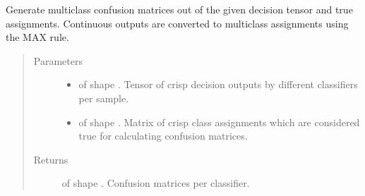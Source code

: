 \documentclass[letterpaper,10pt,english]{sphinxmanual}
\begin{document}
\begin{fulllineitems}
\label{\detokenize{pusion.util.generator:pusion.util.generator.generate_multiclass_confusion_matrices}}
\sphinxAtStartPar
Generate multiclass confusion matrices out of the given decision tensor and true assignments.
Continuous outputs are converted to multiclass assignments using the MAX rule.
\begin{quote}\begin{description}
\item[{Parameters}] \leavevmode\begin{itemize}
\item {} 
\sphinxAtStartPar
{} \textendash{}  of shape .
Tensor of crisp decision outputs by different classifiers per sample.

\item {} 
\sphinxAtStartPar
{} \textendash{}  of shape .
Matrix of crisp class assignments which are considered true for calculating confusion matrices.

\end{itemize}

\item[{Returns}] \leavevmode
\sphinxAtStartPar
{} of shape . Confusion matrices per classifier.

\end{description}\end{quote}

\end{fulllineitems}

\end{document}
